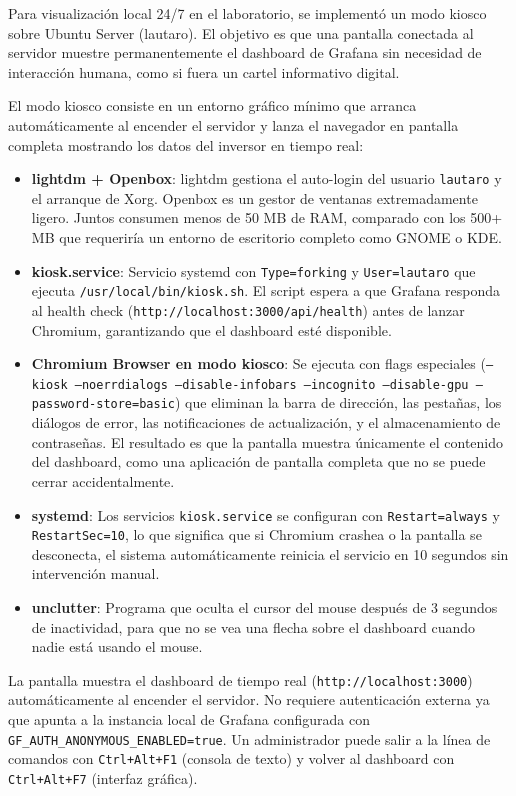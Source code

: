 \documentclass[12pt,a4paper]{article}
\begin{document}
Para visualizaci\'on local 24/7 en el laboratorio, se implement\'o un modo kiosco sobre Ubuntu Server (lautaro). El objetivo es que una pantalla conectada al servidor muestre permanentemente el dashboard de Grafana sin necesidad de interacci\'on humana, como si fuera un cartel informativo digital.

El modo kiosco consiste en un entorno gr\'afico m\'inimo que arranca autom\'aticamente al encender el servidor y lanza el navegador en pantalla completa mostrando los datos del inversor en tiempo real:

\begin{itemize}
    \item \textbf{lightdm + Openbox}: lightdm gestiona el auto-login del usuario \texttt{lautaro} y el arranque de Xorg. Openbox es un gestor de ventanas extremadamente ligero. Juntos consumen menos de 50 MB de RAM, comparado con los 500+ MB que requerir\'ia un entorno de escritorio completo como GNOME o KDE.
    \item \textbf{kiosk.service}: Servicio systemd con \texttt{Type=forking} y \texttt{User=lautaro} que ejecuta \texttt{/usr/local/bin/kiosk.sh}. El script espera a que Grafana responda al health check (\texttt{http://localhost:3000/api/health}) antes de lanzar Chromium, garantizando que el dashboard est\'e disponible.
    \item \textbf{Chromium Browser en modo kiosco}: Se ejecuta con flags especiales (\texttt{--kiosk --noerrdialogs --disable-infobars --incognito --disable-gpu --password-store=basic}) que eliminan la barra de direcci\'on, las pesta\~nas, los di\'alogos de error, las notificaciones de actualizaci\'on, y el almacenamiento de contrase\~nas. El resultado es que la pantalla muestra \'unicamente el contenido del dashboard, como una aplicaci\'on de pantalla completa que no se puede cerrar accidentalmente.
    \item \textbf{systemd}: Los servicios \texttt{kiosk.service} se configuran con \texttt{Restart=always} y \texttt{RestartSec=10}, lo que significa que si Chromium crashea o la pantalla se desconecta, el sistema autom\'aticamente reinicia el servicio en 10 segundos sin intervenci\'on manual.
    \item \textbf{unclutter}: Programa que oculta el cursor del mouse despu\'es de 3 segundos de inactividad, para que no se vea una flecha sobre el dashboard cuando nadie est\'a usando el mouse.
\end{itemize}

La pantalla muestra el dashboard de tiempo real (\texttt{http://localhost:3000}) autom\'aticamente al encender el servidor. No requiere autenticaci\'on externa ya que apunta a la instancia local de Grafana configurada con \texttt{GF\_AUTH\_ANONYMOUS\_ENABLED=true}. Un administrador puede salir a la l\'inea de comandos con \texttt{Ctrl+Alt+F1} (consola de texto) y volver al dashboard con \texttt{Ctrl+Alt+F7} (interfaz gr\'afica).
\end{document}
